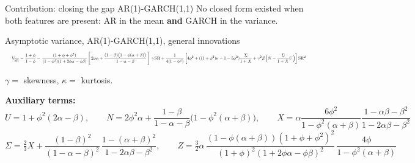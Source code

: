 \documentclass[aspectratio=169,10pt]{beamer}
\begin{document}
\begin{frame}{Contribution: closing the gap AR(1)-GARCH(1,1)}
  \footnotesize
  \setlength{\parskip}{0pt}%
  \setlength{\abovedisplayskip}{2pt}\setlength{\belowdisplayskip}{2pt}%
  \setlength{\abovedisplayshortskip}{1pt}\setlength{\belowdisplayshortskip}{1pt}%
  No closed form existed when \alert{both} features are present:
  AR in the mean \textbf{and} GARCH in the variance.

  \vspace{0.4em}
  \begin{block}{Asymptotic variance, AR(1)-GARCH(1,1), general innovations}
    \[
      \resizebox{\textwidth}{!}{$\displaystyle
      V_{\widehat{\mathrm{SR}}}=\frac{1+\phi}{1-\phi}
        -\,\frac{(1+\phi+\phi^{2})}
                {(1-\phi^{2})(1+2\phi\alpha-\phi\beta)}
           \left[\,2\phi\alpha
             +\frac{(1-\beta)\bigl(1-\phi(\alpha+\beta)\bigr)}{1-\alpha-\beta}\,\right]\,\gamma\,\mathrm{SR}
        +\frac{1}{4(1-\phi^{2})}
         \left[4\phi^{2}+((1+\phi^2)\kappa -1-5\phi^2)\frac{\Sigma}{1+X}
               +\gamma^{2}Z\Bigl(N-\frac{\Sigma}{1+X}U\Bigr)\right]\mathrm{SR}^{2}$}
    \]
  \end{block}

  \vspace{0.1em}
  {\scriptsize $\gamma=$ skewness, \quad $\kappa=$ kurtosis.}
  
  \vfill
  \textbf{Auxiliary terms:}
  \[
    U = 1+\phi^{2}(2\alpha-\beta),\qquad
    N = 2\phi^{2}\alpha+\frac{1-\beta}{1-\alpha-\beta}\bigl(1-\phi^{2}(\alpha+\beta)\bigr),\qquad
    X = \alpha\frac{6\phi^2}{1-\phi^{2}(\alpha+\beta)}\frac{1-\alpha\beta-\beta^2}{1-2\alpha\beta-\beta^2}
  \]
  \[
    \Sigma = \tfrac{2}{3}X
             +\frac{(1-\beta)^{2}}{(1-\alpha-\beta)^{2}}\,
              \frac{1-(\alpha+\beta)^{2}}{1-2\alpha\beta-\beta^{2}},\qquad
    Z = \tfrac{3}{2}\alpha\,
        \frac{(1-\phi(\alpha+\beta))(1+\phi+\phi^{2})^{2}}
             {(1+\phi)^{2}(1+2\phi\alpha-\phi\beta)^{2}}\,
        \frac{4\phi}{1-\phi^{2}(\alpha+\beta)}
  \]

  
  
\end{frame}
\end{document}
